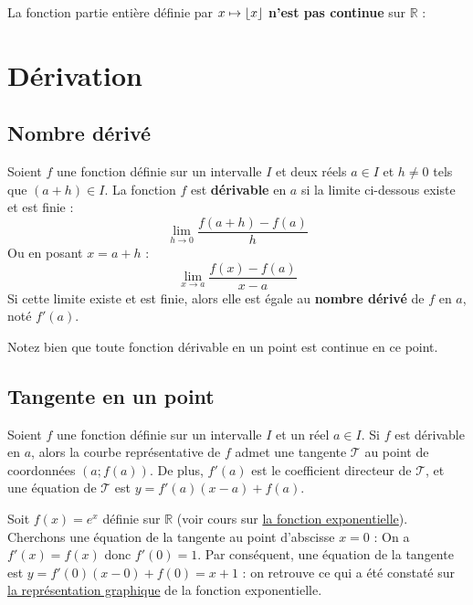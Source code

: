 	La fonction partie entière définie par $x \mapsto \lfloor x \rfloor$ \textbf{n'est pas continue} sur $\mathbb{R}$ :


	\section{Dérivation}

	\subsection{Nombre dérivé}

	\begin{formula}[Définition]
		Soient $f$ une fonction définie sur un intervalle $I$ et deux réels $a \in I$ et $h \neq 0$ tels que $(a + h) \in I$. La fonction $f$ est \textbf{dérivable} en $a$ si la limite ci-dessous existe et est finie :
		\[ \lim\limits_{h \rightarrow 0} \frac{f(a + h) - f(a)}{h} \]
		Ou en posant $x = a + h$ :
		\[ \lim\limits_{x \rightarrow a} \frac{f(x) - f(a)}{x-a} \]
		Si cette limite existe et est finie, alors elle est égale au \textbf{nombre dérivé} de $f$ en $a$, noté $f'(a)$.
	\end{formula}

	\begin{tip}[Remarque]
		Notez bien que toute fonction dérivable en un point est continue en ce point.
	\end{tip}

	\subsection{Tangente en un point}

	\begin{formula}
		Soient $f$ une fonction définie sur un intervalle $I$ et un réel $a \in I$. Si $f$ est dérivable en $a$, alors la courbe représentative de $f$ admet une tangente $\mathcal{T}$ au point de coordonnées $(a; f(a))$.
		\newpar
		De plus, $f'(a)$ est le coefficient directeur de $\mathcal{T}$, et une équation de $\mathcal{T}$ est $y = f'(a)(x-a)+f(a)$.
	\end{formula}

	\begin{tip}[Exemple]
		Soit $f(x) = e^x$ définie sur $\mathbb{R}$ (voir cours sur \href{https://bacomathiqu.es/cours/premiere/fonction-exponentielle/}{la fonction exponentielle}).
		\newpar
		Cherchons une équation de la tangente au point d'abscisse $x = 0$ :
		\newpar
		On a $f'(x) = f(x)$ donc $f'(0) = 1$.
		\newpar
		Par conséquent, une équation de la tangente est $y = f'(0)(x-0)+f(0) = x + 1$ :
		on retrouve ce qui a été constaté sur \href{https://bacomathiqu.es/cours/premiere/fonction-exponentielle/#3-representation-graphique}{la représentation graphique} de la fonction exponentielle.
	\end{tip}

